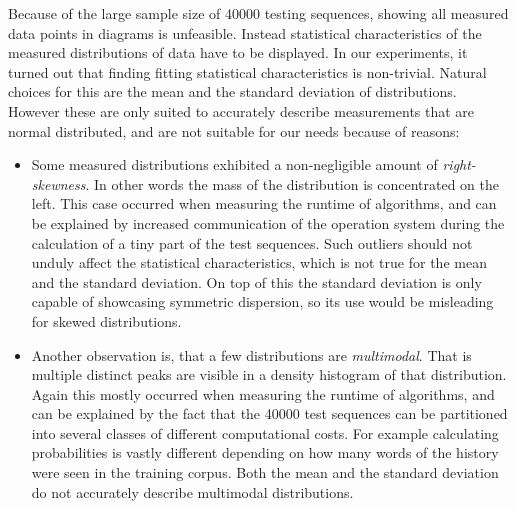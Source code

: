 Because of the large sample size of \num{40000} testing sequences, showing
all measured data points in diagrams is unfeasible.
Instead statistical characteristics of the measured distributions of data
have to be displayed.
In our experiments, it turned out that finding fitting statistical
characteristics is non-trivial.
Natural choices for this are the mean and the standard deviation of
distributions.
However these are only suited to accurately describe measurements that are
normal distributed, and are not suitable for our needs because of reasons:
\begin{itemize}
  \item Some measured distributions exhibited a non-negligible amount of
    \emph{right-skewness}.
    In other words the mass of the distribution is concentrated on the left.
    This case occurred when measuring the runtime of algorithms, and can be
    explained by increased communication of the operation system during the
    calculation of a tiny part of the test sequences.
    Such outliers should not unduly affect the statistical characteristics,
    which is not true for the mean and the standard deviation.
    On top of this the standard deviation is only capable of showcasing
    symmetric dispersion, so its use would be misleading for skewed
    distributions.
  \item Another observation is, that a few distributions are \emph{multimodal}.
    That is multiple distinct peaks are visible in a density histogram of that
    distribution.
    Again this mostly occurred when measuring the runtime of algorithms,
    and can be explained by the fact that the \num{40000} test sequences can
    be partitioned into several classes of different computational costs.
    For example calculating probabilities is vastly different depending on
    how many words of the history were seen in the training corpus.
    Both the mean and the standard deviation do not accurately describe
    multimodal distributions.
\end{itemize}

